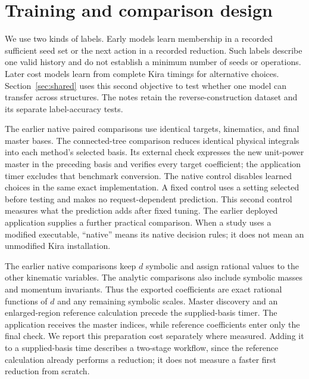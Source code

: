 \documentclass[11pt,a4paper]{article}
\begin{document}







\section{Training and comparison design}
\label{sec:design}
We use two kinds of labels. Early models learn membership in a recorded sufficient seed set or the next action in a recorded reduction. Such labels describe one valid history and do not establish a minimum number of seeds or operations. Later cost models learn from complete Kira timings for alternative choices. Section~\ref{sec:shared} uses this second objective to test whether one model can transfer across structures. The notes retain the reverse-construction dataset and its separate label-accuracy tests.

The earlier native paired comparisons use identical targets, kinematics, and final master bases. The connected-tree comparison reduces identical physical integrals into each method's selected basis. Its external check expresses the new unit-power master in the preceding basis and verifies every target coefficient; the application timer excludes that benchmark conversion. The native control disables learned choices in the same exact implementation. A fixed control uses a setting selected before testing and makes no request-dependent prediction. This second control measures what the prediction adds after fixed tuning. The earlier deployed application supplies a further practical comparison. When a study uses a modified executable, ``native'' means its native decision rules; it does not mean an unmodified Kira installation.

The earlier native comparisons keep $d$ symbolic and assign rational values to the other kinematic variables. The analytic comparisons also include symbolic masses and momentum invariants. Thus the exported coefficients are exact rational functions of $d$ and any remaining symbolic scales. Master discovery and an enlarged-region reference calculation precede the supplied-basis timer. The application receives the master indices, while reference coefficients enter only the final check. We report this preparation cost separately where measured. Adding it to a supplied-basis time describes a two-stage workflow, since the reference calculation already performs a reduction; it does not measure a faster first reduction from scratch.
\end{document}
